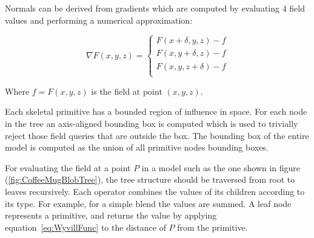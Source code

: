 Normals can be derived from gradients which are computed by evaluating 4 field values and performing a numerical approximation:

\begin{equation}
\nabla F(x,y,z)=\left\{ \begin{array}{rl}
 F(x+\delta,y,z)-f \\
 F(x, y +\delta,z)-f \\
 F(x, y, z+\delta)-f \\
  \end{array} \right. 
\label{eq:Normal}
\end{equation}

Where $f = F(x,y,z)$ is the field at point $(x,y,z)$.

Each skeletal primitive has a bounded region of influence in space. For each node in the tree an
axis-aligned bounding box is computed which is used to trivially reject those field queries that 
are outside the box. The bounding box of the entire model is computed as the union of all primitive
nodes bounding boxes.

For evaluating the field  at a point $P$ in a \blob model such as the one shown in figure (\ref{fig:CoffeeMugBlobTree}), 
the tree structure should be traversed from root to leaves recursively. Each operator combines the values of its children 
according to its type. For example, for a simple blend the values are summed. A leaf node represents a primitive,  and 
returns the value by applying equation~\ref{eq:WyvillFunc} to the distance of $P$ from the primitive.

